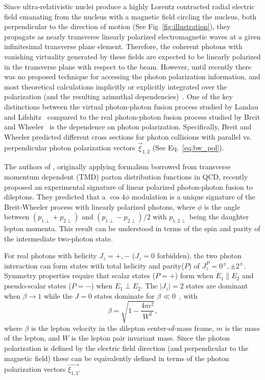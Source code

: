 \documentclass[12pt,epjc3]{svjour3}\sloppy
\begin{document}
Since ultra-relativistic nuclei produce a highly Lorentz contracted radial electric field emanating from the nucleus with a magnetic field circling the nucleus, both perpendicular to the direction of motion (See Fig~\ref{fig:illustration}), they propagate as nearly transverse linearly polarized electromagnetic waves at a given infinitesimal transverse plane element. 
Therefore, the coherent photons with vanishing virtuality generated by these fields are expected to be linearly polarized in the transverse plane with respect to the beam. 
However, until recently there was no proposed technique for accessing the photon polarization information, and most theoretical calculations implicitly or explicitly integrated over the polarization (and the resulting azimuthal dependencies)~\cite{SuperChic3}. 
One of the key distinctions between the virtual photon-photon fusion process studied by Landau and Lifshitz~\cite{landauCreationElectronsPositrons1934} compared to the real photon-photon fusion process studied by Breit and Wheeler~\cite{breitCollisionTwoLight1934} is the dependence on photon polarization.
Specifically, Breit and Wheeler predicted different cross sections for photon collisions with parallel vs. perpendicular photon polarization vectors $\vec{\xi}_{1,2}$ (See Eq.~\ref{eq:bw_pol}). 

The authors of \cite{liProbingLinearPolarization2019}, originally applying formalism borrowed from transverse momentum dependent (TMD) parton distribution functions in QCD, recently proposed an experimental signature of linear polarized photon-photon fusion to dileptons.
They predicted that a $\cos4\phi$ modulation is a unique signature of the Breit-Wheeler process with linearly polarized photons, where $\phi$ is the angle between $(p_{1\perp} + p_{2\perp})$ and $(p_{1\perp} - p_{2\perp})/2$ with $p_{1,2\perp}$ being the daughter lepton momenta.  
This result can be understood in terms of the spin and parity of the intermediate two-photon state.

For real photons with helicity $J_z=+,-$ ($J_z=0$ forbidden), the two photon interaction can form states with total helicity and parity($P$) of $J_z^P = 0^\pm, \pm2^\pm$. 
Symmetry properties require that scalar states ($P=+$) form when $E_1 \parallel E_2$ and pseudo-scalar states ($P=-$) when $E_1 \perp E_2$. The $|J_z|=2$ states are dominant when $\beta \rightarrow 1$ while the $J=0$ states dominate for $\beta \ll 0$~\cite{klusek-gawendaCentralityDependenceDilepton2021}, with 
\begin{equation}
    \beta = \sqrt{1 - \frac{4m^2}{W^2}},
\end{equation}
where $\beta$ is the lepton velocity in the dilepton center-of-mass frame, $m$ is the mass of the lepton, and $W$ is the lepton pair invariant mass.
Since the photon polarization is defined by the electric field direction (and perpendicular to the magnetic field) these can be equivalently defined in terms of the photon polarization vectors $\vec{\xi_{1,2}}$.
\end{document}
